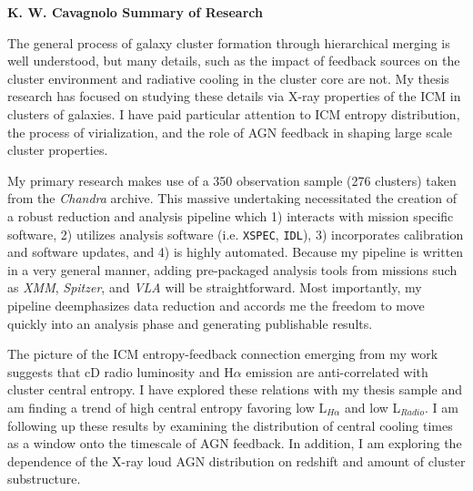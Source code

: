 \documentclass[11pt]{article}
\newcommand{\sekshun}[1]
{
\markboth{\hfill \bf{K. W. Cavagnolo}{#1} \bf{Summary of Research} \hfill}
	 {\hfill \bf{K. W. Cavagnolo}{#1} \bf{Summary of Research} \hfill}
}
\begin{document}
\sekshun{}
The general process of galaxy cluster formation through hierarchical
merging is well understood, but many details, such as the impact of
feedback sources on the cluster environment and radiative cooling in
the cluster core are not. My thesis research has focused on studying
these details via X-ray properties of the ICM in clusters of
galaxies. I have paid particular attention to ICM entropy
distribution, the process of virialization, and the role of AGN
feedback in shaping large scale cluster properties.

My primary research makes use of a 350 observation sample (276
clusters) taken from the {\textit{Chandra}} archive. This massive
undertaking necessitated the creation of a robust reduction and
analysis pipeline which 1) interacts with mission specific software,
2) utilizes analysis software (i.e. {\tt{XSPEC}}, {\tt{IDL}}), 3)
incorporates calibration and software updates, and 4) is highly
automated. Because my pipeline is written in a very general manner,
adding pre-packaged analysis tools from missions such as
{\textit{XMM}}, {\textit{Spitzer}}, and {\textit{VLA}} will be
straightforward. Most importantly, my pipeline deemphasizes data
reduction and accords me the freedom to move quickly into an analysis
phase and generating publishable results.

The picture of the ICM entropy-feedback connection emerging from my
work suggests that cD radio luminosity and H$\alpha$ emission are
anti-correlated with cluster central entropy. I have explored these
relations with my thesis sample and am finding a trend of high central
entropy favoring low L$_{H\alpha}$ and low L$_{Radio}$. I am
following up these results by examining the distribution of central
cooling times as a window onto the timescale of AGN feedback. In
addition, I am exploring the dependence of the X-ray loud AGN
distribution on redshift and amount of cluster substructure.
\end{document}
